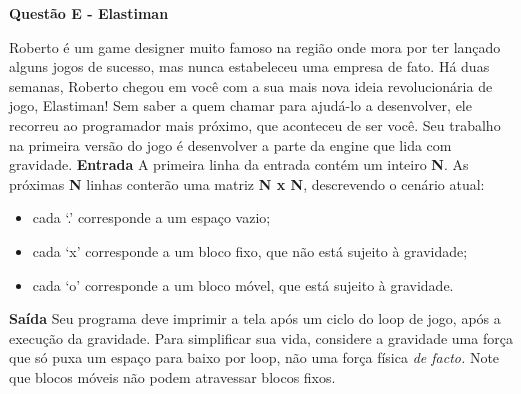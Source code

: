 \documentclass[a4paper, 12pt]{article}
\begin{document}
\newpage %
\begin{center}
\textbf{{\Large Questão E - Elastiman}}
\end{center}
\vspace{5pt}
Roberto é um game designer muito famoso na região onde mora por ter
lançado alguns jogos de sucesso, mas nunca estabeleceu uma empresa de
fato. \newline \newline
Há duas semanas, Roberto chegou em você com a sua mais nova ideia
revolucionária de jogo, Elastiman! Sem saber a quem chamar para ajudá-lo a
desenvolver, ele recorreu ao programador mais próximo, que aconteceu de
ser você. \newline \newline
Seu trabalho na primeira versão do jogo é desenvolver a parte da engine que
lida com gravidade. \newline \newline
\textbf{{\large Entrada}} \newline
A primeira linha da entrada contém um inteiro \textbf{N}. \newline
As próximas \textbf{N} linhas conterão uma matriz \textbf{N x N}, descrevendo o cenário
atual:
\begin{itemize}
\item cada `.' corresponde a um espaço vazio;
\item cada `x' corresponde a um bloco fixo, que não está sujeito à gravidade;
\item cada `o' corresponde a um bloco móvel, que está sujeito à gravidade.
\end{itemize}
\textbf{{\large Saída}} \newline
Seu programa deve imprimir a tela após um ciclo do loop de jogo, após a
execução da gravidade. Para simplificar sua vida, considere a gravidade uma
força que só puxa um espaço para baixo por loop, não uma força física \textit{de
facto.} Note que blocos móveis não podem atravessar blocos fixos.
\newline
\end{document}
